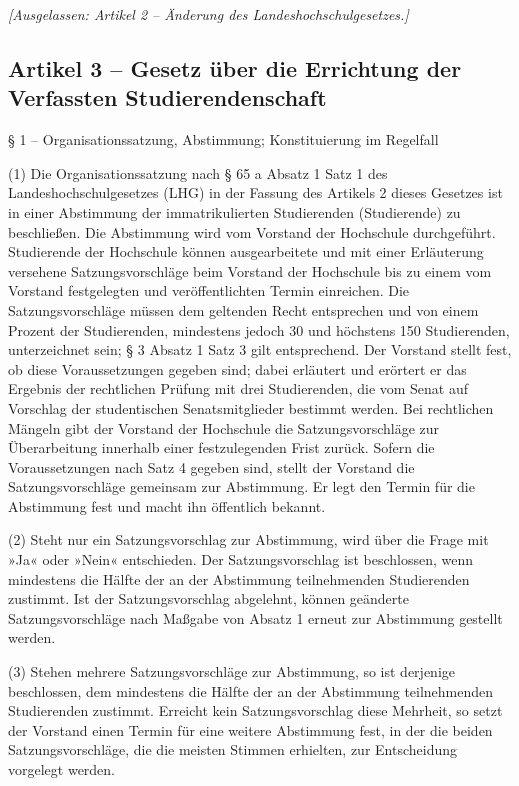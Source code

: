\documentclass[
10pt,
a4paper,
twoside,								%
titlepage=false,							%
draft=false								%
]{scrartcl}
\begin{document}
\bigskip
\emph{[Ausgelassen: Artikel 2 – Änderung des Landeshochschulgesetzes.]}


\subsection{Artikel 3 – Gesetz über die Errichtung der Verfassten Studierendenschaft}

§ 1 – Organisationssatzung, Abstimmung; Konstituierung im Regelfall

(1) Die Organisationssatzung nach § 65 a Absatz 1 Satz 1 des Landeshochschulgesetzes (LHG) in der Fassung des Artikels 2 dieses Gesetzes ist in einer Abstimmung der immatrikulierten Studierenden (Studierende) zu beschließen. Die Abstimmung wird vom Vorstand der Hochschule durchgeführt. Studierende der Hochschule können ausgearbeitete und mit einer Erläuterung versehene Satzungsvorschläge beim Vorstand der Hochschule bis zu einem vom Vorstand festgelegten und veröffentlichten Termin einreichen. Die Satzungsvorschläge müssen dem geltenden Recht entsprechen und von einem Prozent der Studierenden, mindestens jedoch 30 und höchstens 150 Studierenden, unterzeichnet sein; § 3 Absatz 1 Satz 3 gilt entsprechend. Der Vorstand stellt fest, ob diese Voraussetzungen gegeben sind; dabei erläutert und erörtert er das Ergebnis der rechtlichen Prüfung mit drei Studierenden, die vom Senat auf Vorschlag der studentischen Senatsmitglieder bestimmt werden. Bei rechtlichen Mängeln gibt der Vorstand der Hochschule die Satzungsvorschläge zur Überarbeitung innerhalb einer festzulegenden Frist zurück. Sofern die Voraussetzungen nach Satz 4 gegeben sind, stellt der Vorstand die Satzungsvorschläge gemeinsam zur Abstimmung. Er legt den Termin für die Abstimmung fest und macht ihn öffentlich bekannt.

(2) Steht nur ein Satzungsvorschlag zur Abstimmung, wird über die Frage mit »Ja« oder »Nein« entschieden. Der Satzungsvorschlag ist beschlossen, wenn mindestens die Hälfte der an der Abstimmung teilnehmenden Studierenden zustimmt. Ist der Satzungsvorschlag abgelehnt, können geänderte Satzungsvorschläge nach Maßgabe von Absatz 1 erneut zur Abstimmung gestellt werden.

(3) Stehen mehrere Satzungsvorschläge zur Abstimmung, so ist derjenige beschlossen, dem mindestens die Hälfte der an der Abstimmung teilnehmenden Studierenden zustimmt. Erreicht kein Satzungsvorschlag diese Mehrheit, so setzt der Vorstand einen Termin für eine weitere Abstimmung fest, in der die beiden Satzungsvorschläge, die die meisten Stimmen erhielten, zur Entscheidung vorgelegt werden.
\end{document}
